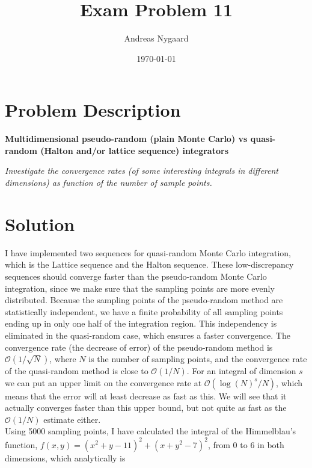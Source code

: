 \documentclass{article}
\begin{document}
\title{Exam Problem 11}
\author{Andreas Nygaard}
\date{\today}
\maketitle

\section*{Problem Description}

\begin{center}
\textbf{Multidimensional pseudo-random (plain Monte Carlo) vs quasi-random (Halton and/or lattice sequence) 
integrators}
\vspace{0.4cm}

\textit{Investigate the convergence rates (of some interesting integrals in different dimensions) as function 
of the number of sample points.}
\end{center}


\section*{Solution}

I have implemented two sequences for quasi-random Monte Carlo integration, which is the Lattice sequence
and the Halton sequence. These low-discrepancy sequences should converge faster than the pseudo-random
Monte Carlo integration, since we make sure that the sampling points are more evenly distributed. Because
the sampling points of the pseudo-random method are statistically independent, we have a finite probability
of all sampling points ending up in only one half of the integration region. This independency is eliminated
in the quasi-random case, which ensures a faster convergence\cite{ppnm}. The convergence rate (the decrease of error) of 
the pseudo-random method is $\mathcal{O}(1/\sqrt{N})$, where $N$ is the number of sampling points, and the 
convergence rate of the quasi-random method is close to $\mathcal{O}(1/N)$. For an integral of dimension $s$
we can put an upper limit on the convergence rate at $\mathcal{O}(\log(N)^s/N)$, which means that the error
will at least decrease as fast as this\cite{wiki}. We will see that it actually converges faster than this upper bound,
but not quite as fast as the $\mathcal{O}(1/N)$ estimate either.
\\

Using 5000 sampling points, I have calculated the integral of the Himmelblau's function, $f(x,y)=(x^2+y-11)^2+(x+y^2-7)^2$,
from 0 to 6 in both dimensions, which analytically is
\end{document}
